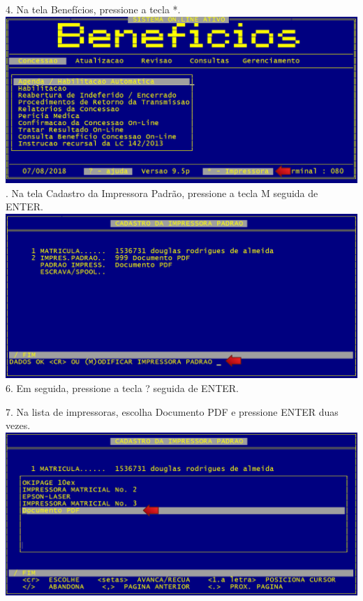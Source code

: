 \documentclass[12pt,a4paper]{article}
\begin{document}
\vspace{0.3cm}
4. Na tela Benefícios, pressione a tecla *.\\
\includegraphics[width=1.0\textwidth, center]{beneficios}\\

. Na tela Cadastro da Impressora Padrão, pressione a tecla M seguida de ENTER.\\
\includegraphics[width=1.0\textwidth, center]{modimpressora}\\

\vspace{0.3cm}
6. Em seguida, pressione a tecla ? seguida de ENTER.

7. Na lista de impressoras, escolha Documento PDF e pressione ENTER duas vezes.\\
\includegraphics[width=1.0\textwidth, center]{listaimpressoras}\\
\end{document}
